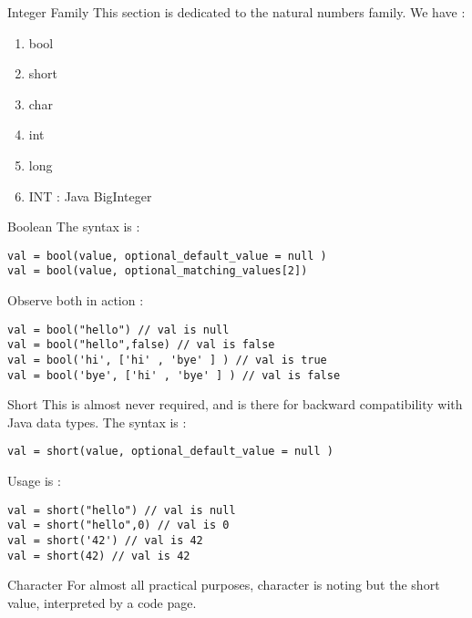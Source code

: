 \begin{section}{Integer Family}
This section is dedicated to the natural numbers family.
We have :
\begin{enumerate}
\item{bool}
\item{short}
\item{char}
\item{int}
\item{long}
\item{INT : Java BigInteger}
\end{enumerate}

\begin{subsection}{Boolean}
The syntax is :
\begin{lstlisting}[style=JexlStyle]
val = bool(value, optional_default_value = null )
val = bool(value, optional_matching_values[2])
\end{lstlisting}
Observe both in action :
\begin{center}\begin{minipage}{\linewidth}
\begin{lstlisting}[style=JexlStyle]
val = bool("hello") // val is null
val = bool("hello",false) // val is false
val = bool('hi', ['hi' , 'bye' ] ) // val is true 
val = bool('bye', ['hi' , 'bye' ] ) // val is false 
\end{lstlisting}
\end{minipage}\end{center}

\end{subsection}

\begin{subsection}{Short}
This is almost never required, and is there for backward compatibility with Java data types.
The syntax is :

\begin{lstlisting}[style=JexlStyle]
val = short(value, optional_default_value = null )
\end{lstlisting}

Usage is :

\begin{lstlisting}[style=JexlStyle]
val = short("hello") // val is null
val = short("hello",0) // val is 0
val = short('42') // val is 42 
val = short(42) // val is 42 
\end{lstlisting}

\end{subsection}

\begin{subsection}{Character}
For almost all practical purposes, character is noting but the short value, 
interpreted by a code page.


\end{subsection}
\end{section}
